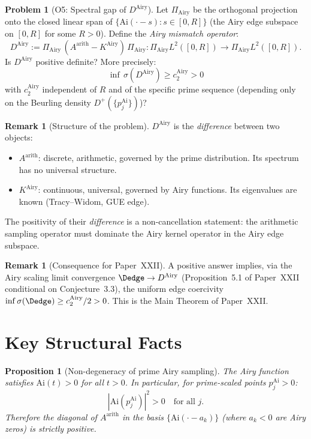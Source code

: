 \documentclass[12pt,a4paper]{amsart}
\newtheorem{proposition}[theorem]{Proposition}
\theoremstyle{definition}
\newtheorem{remark}[theorem]{Remark}
\newtheorem{problem}[theorem]{Problem}
\newcommand{\Ai}{\mathrm{Ai}}
\newcommand{\KAi}{K^{\mathrm{Airy}}}
\newcommand{\DAi}{D^{\mathrm{Airy}}}
\newcommand{\PAi}{\Pi_{\mathrm{Airy}}}
\begin{document}
\begin{problem}[O5: Spectral gap of $\DAi$]\label{prob:O5}
Let $\PAi$ be the orthogonal projection onto the
closed linear span of $\{\Ai(\cdot - s) : s \in [0,R]\}$
(the Airy edge subspace on $[0,R]$ for some $R > 0$).
Define the \emph{Airy mismatch operator}:
\[
  \DAi
  := \PAi\,(A^{\mathrm{arith}} - \KAi)\,\PAi
  : \PAi L^2([0,R]) \to \PAi L^2([0,R]).
\]
Is $\DAi$ positive definite? More precisely:
\begin{equation}\label{eq:O5}
  \inf\,\sigma(\DAi) \ge c_2^{\mathrm{Airy}} > 0
\end{equation}
with $c_2^{\mathrm{Airy}}$ independent of $R$ and of
the specific prime sequence (depending only on
the Beurling density $D^+(\{p_j^{\mathrm{Ai}}\})$)?
\end{problem}

\begin{remark}[Structure of the problem]
$\DAi$ is the \emph{difference} between two objects:
\begin{itemize}
  \item $A^{\mathrm{arith}}$: discrete, arithmetic,
    governed by the prime distribution.
    Its spectrum has no universal structure.
  \item $\KAi$: continuous, universal,
    governed by Airy functions.
    Its eigenvalues are known (Tracy--Widom, GUE edge).
\end{itemize}
The positivity of their \emph{difference}
is a non-cancellation statement:
the arithmetic sampling operator must dominate
the Airy kernel operator in the Airy edge subspace.
\end{remark}

\begin{remark}[Consequence for Paper~XXII]
A positive answer implies, via the Airy scaling limit
convergence $\Dedge \to \DAi$ (Proposition~5.1 of Paper~XXII
conditional on Conjecture~3.3), the uniform edge coercivity
$\inf\sigma(\Dedge) \ge c_2^{\mathrm{Airy}}/2 > 0$.
This is the Main Theorem of Paper~XXII.
\end{remark}

\section{Key Structural Facts}
\label{sec:facts}

\begin{proposition}[Non-degeneracy of prime Airy sampling]%
\label{prop:nondeg}
The Airy function satisfies $\Ai(t) > 0$ for all $t > 0$.
In particular, for prime-scaled points $p_j^{\mathrm{Ai}} > 0$:
\[
  |\Ai(p_j^{\mathrm{Ai}})|^2 > 0
  \quad \text{for all } j.
\]
Therefore the diagonal of $A^{\mathrm{arith}}$
in the basis $\{\Ai(\cdot - a_k)\}$
(where $a_k < 0$ are Airy zeros) is strictly positive.
\end{proposition}
\end{document}
